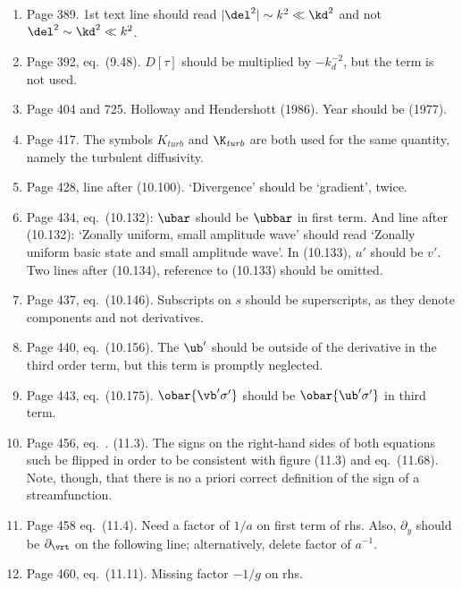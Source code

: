 \documentclass[10pt]{article}
\newcommand{\eq}{eq.\ } \newcommand{\Eq}{Eq.\ }
\begin{document}
\begin{enumerate}
\item Page 389. 1st text line should read $|\del^2| \sim
k^2 \ll \kd^2$ and not $\del^2 \sim
\kd^2 \ll k^2$.

\item Page 392, \eq (9.48). $D[\tau]$ should be multiplied by $-k_d^{-2}$, but the term is not used.

\item Page 404 and 725. Holloway and Hendershott (1986). Year should be (1977).

\item Page 417. The symbols $K_{\textit{turb}}$ and $\K_{\textit{turb}}$ are both used for the same quantity, namely the turbulent diffusivity.

\item Page 428, line after (10.100). `Divergence' should be `gradient', twice.

\item Page 434, \eq (10.132): $\ubar$ should be $\ubbar$ in first term. And line after (10.132): `Zonally uniform, small amplitude wave' should read `Zonally uniform basic state and small amplitude wave'. In (10.133), $u'$ should be $v'$. Two lines after (10.134), reference to (10.133) should be omitted.

\item Page 437, \eq (10.146). Subscripts on $s$ should be superscripts, as they denote components and not derivatives. 

\item Page 440, \eq (10.156). The $\ub'$ should be outside of the derivative in the third order term, but this term is promptly neglected. 

\item Page 443, \eq (10.175). $\obar{\vb' \sigma'}$ should be $\obar{\ub' \sigma'}$ in third term.
 
\item Page 456, \eq. (11.3). The signs on the right-hand sides of both equations such be flipped in order to be consistent with figure (11.3) and \eq (11.68). Note, though, that there is no a priori correct definition of the sign of a streamfunction.

\item Page 458 \eq (11.4). Need a factor of $1/a$ on first term of rhs. Also, $\partial_y$ should be $\partial_\vrt$ on the following line; alternatively, delete factor of $a^{-1}$.

\item Page 460, \eq (11.11). Missing factor $-1/g$ on rhs.


\end{enumerate}
\end{document}
